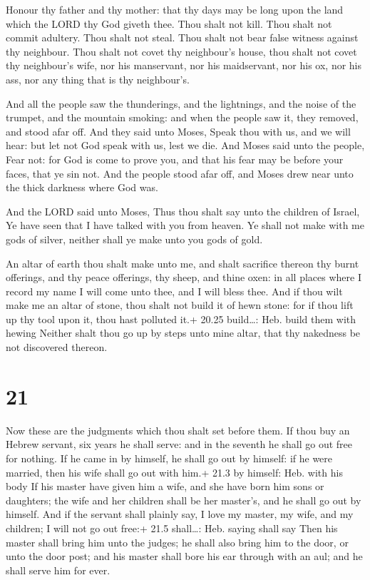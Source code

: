 Honour thy father and thy mother: that thy days may be
long upon the land which the LORD thy God giveth thee. 
Thou shalt not kill.  Thou shalt not commit adultery.
 Thou shalt not steal.  Thou shalt not bear
false witness against thy neighbour.  Thou shalt not covet
thy neighbour's house, thou shalt not covet thy neighbour's wife, nor
his manservant, nor his maidservant, nor his ox, nor his ass, nor any
thing that is thy neighbour's.

 And all the people saw the thunderings, and the
lightnings, and the noise of the trumpet, and the mountain smoking: and
when the people saw it, they removed, and stood afar off. 
And they said unto Moses, Speak thou with us, and we will hear: but let
not God speak with us, lest we die.  And Moses said unto
the people, Fear not: for God is come to prove you, and that his fear
may be before your faces, that ye sin not.  And the people
stood afar off, and Moses drew near unto the thick darkness where God
was.

 And the LORD said unto Moses, Thus thou shalt say unto
the children of Israel, Ye have seen that I have talked with you from
heaven.  Ye shall not make with me gods of silver, neither
shall ye make unto you gods of gold.

 An altar of earth thou shalt make unto me, and shalt
sacrifice thereon thy burnt offerings, and thy peace offerings, thy
sheep, and thine oxen: in all places where I record my name I will come
unto thee, and I will bless thee.  And if thou wilt make me
an altar of stone, thou shalt not build it of hewn stone: for if thou
lift up thy tool upon it, thou hast polluted it.+ 20.25 build\ldots:
Heb. build them with hewing  Neither shalt thou go up by
steps unto mine altar, that thy nakedness be not discovered thereon.

\hypertarget{section-20}{%
\section{21}\label{section-20}}

 Now these are the judgments which thou shalt set before
them.  If thou buy an Hebrew servant, six years he shall
serve: and in the seventh he shall go out free for nothing. 
If he came in by himself, he shall go out by himself: if he were
married, then his wife shall go out with him.+ 21.3 by himself: Heb.
with his body  If his master have given him a wife, and she
have born him sons or daughters; the wife and her children shall be her
master's, and he shall go out by himself.  And if the
servant shall plainly say, I love my master, my wife, and my children; I
will not go out free:+ 21.5 shall\ldots: Heb. saying shall say
 Then his master shall bring him unto the judges; he shall
also bring him to the door, or unto the door post; and his master shall
bore his ear through with an aul; and he shall serve him for ever.

